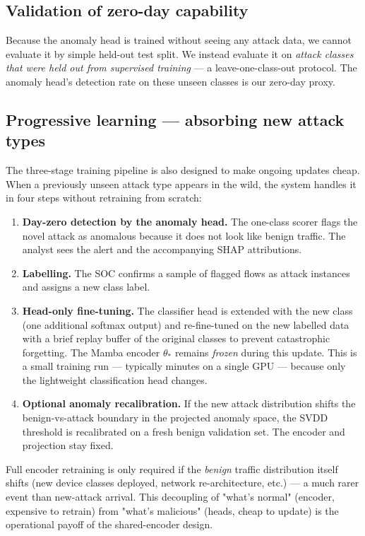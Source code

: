 \documentclass[11pt,a4paper]{article}
\begin{document}
\subsection{Validation of zero-day capability}
Because the anomaly head is trained without seeing any attack data, we cannot evaluate it by simple held-out test split. We instead evaluate it on \emph{attack classes that were held out from supervised training} --- a leave-one-class-out protocol. The anomaly head's detection rate on these unseen classes is our zero-day proxy.

\subsection{Progressive learning --- absorbing new attack types}
The three-stage training pipeline is also designed to make ongoing updates cheap. When a previously unseen attack type appears in the wild, the system handles it in four steps without retraining from scratch:
\begin{enumerate}[leftmargin=*, itemsep=2pt]
  \item \textbf{Day-zero detection by the anomaly head.} The one-class scorer flags the novel attack as anomalous because it does not look like benign traffic. The analyst sees the alert and the accompanying SHAP attributions.
  \item \textbf{Labelling.} The SOC confirms a sample of flagged flows as attack instances and assigns a new class label.
  \item \textbf{Head-only fine-tuning.} The classifier head is extended with the new class (one additional softmax output) and re-fine-tuned on the new labelled data with a brief replay buffer of the original classes to prevent catastrophic forgetting. The Mamba encoder $\theta_*$ remains \emph{frozen} during this update. This is a small training run --- typically minutes on a single GPU --- because only the lightweight classification head changes.
  \item \textbf{Optional anomaly recalibration.} If the new attack distribution shifts the benign-vs-attack boundary in the projected anomaly space, the SVDD threshold is recalibrated on a fresh benign validation set. The encoder and projection stay fixed.
\end{enumerate}
Full encoder retraining is only required if the \emph{benign} traffic distribution itself shifts (new device classes deployed, network re-architecture, etc.) --- a much rarer event than new-attack arrival. This decoupling of "what's normal" (encoder, expensive to retrain) from "what's malicious" (heads, cheap to update) is the operational payoff of the shared-encoder design.
\end{document}
